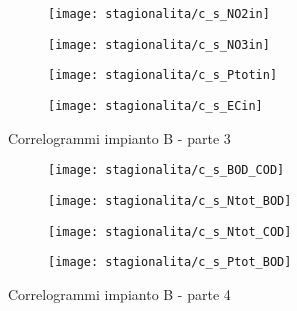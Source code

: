 \begin{sidewaysfigure}[h]\ContinuedFloat
	\renewcommand*\thesubfigure{(\arabic{subfigure})}
	\begin{subfigure}{0.49\textwidth}
		\texttt{[image: stagionalita/c\_s\_NO2in]}
		\caption{}
		\centering
	\end{subfigure}
	\begin{subfigure}{0.49\textwidth}
		\texttt{[image: stagionalita/c\_s\_NO3in]}
		\caption{}
		\centering
	\end{subfigure}

	\begin{subfigure}{0.49\textwidth}
		\texttt{[image: stagionalita/c\_s\_Ptotin]}
		\caption{}
		\centering
	\end{subfigure}
	\begin{subfigure}{0.49\textwidth}
		\texttt{[image: stagionalita/c\_s\_ECin]}	
		\caption{}
		\centering
	\end{subfigure}
	\caption{Correlogrammi impianto B - parte 3}
\end{sidewaysfigure}
\clearpage
\begin{sidewaysfigure}[h]\ContinuedFloat
	\renewcommand*\thesubfigure{(\arabic{subfigure})}
	\begin{subfigure}{0.49\textwidth}
		\texttt{[image: stagionalita/c\_s\_BOD\_COD]}
		\caption{}
		\centering
	\end{subfigure}
	\begin{subfigure}{0.49\textwidth}
		\texttt{[image: stagionalita/c\_s\_Ntot\_BOD]}
		\caption{}
		\centering
	\end{subfigure}

	\begin{subfigure}{0.49\textwidth}
		\texttt{[image: stagionalita/c\_s\_Ntot\_COD]}
		\caption{}
		\centering
	\end{subfigure}
	\begin{subfigure}{0.49\textwidth}
		\texttt{[image: stagionalita/c\_s\_Ptot\_BOD]}	
		\caption{}
		\centering
	\end{subfigure}
	\caption{Correlogrammi impianto B - parte 4}
\end{sidewaysfigure}

\clearpage

